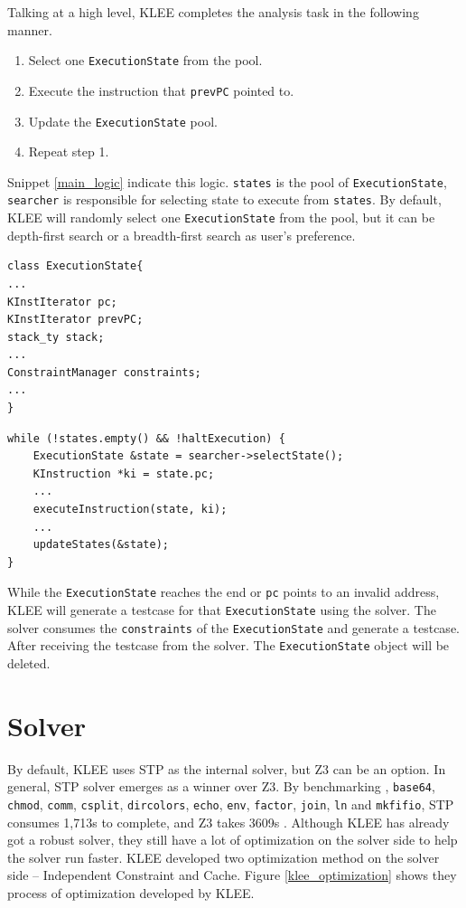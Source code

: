 Talking at a high level, KLEE completes the analysis task in the following manner. 
\begin{enumerate}
    \item Select one \texttt{ExecutionState} from the pool.
    \item Execute the instruction that \texttt{prevPC} pointed to.
    \item Update the \texttt{ExecutionState} pool.
    \item Repeat step 1.
\end{enumerate}
Snippet \ref{main_logic} indicate this logic. \texttt{states} is the pool of \texttt{ExecutionState}, \texttt{searcher} is responsible for selecting state to execute from \texttt{states}. By default, KLEE will randomly select one \texttt{ExecutionState} from the pool, but it can be depth-first search or a breadth-first search as user's preference.

\begin{spacing}{1}
{
\begin{lstlisting}[frame=shadowbox, caption={ExecutionState},label={execution_state}]
class ExecutionState{
...
KInstIterator pc;
KInstIterator prevPC;
stack_ty stack;
...
ConstraintManager constraints;
...
}
\end{lstlisting}
}
\end{spacing}
\clearpage
\begin{spacing}{1}
{
\begin{lstlisting}[frame=shadowbox, caption={KLEE's Main Logic},label={main_logic}]
while (!states.empty() && !haltExecution) {
    ExecutionState &state = searcher->selectState();
    KInstruction *ki = state.pc;
    ...
    executeInstruction(state, ki);
    ...
    updateStates(&state);
}
\end{lstlisting}
}
\end{spacing}
While the \texttt{ExecutionState} reaches the end or \texttt{pc} points to an invalid address, KLEE will generate a  testcase for that \texttt{ExecutionState} using the solver. The solver consumes the \texttt{constraints} of the \texttt{ExecutionState} and generate a testcase. After receiving the testcase from the solver. The \texttt{ExecutionState} object will be deleted.

\section{Solver}

By default, KLEE uses STP \cite{Ganesh:2007:DPB:1770351.1770421} as the internal solver, but Z3 \cite{DeMoura:2008:ZES:1792734.1792766} can be an option. In general, STP solver emerges as a winner over Z3. By benchmarking \text{[}, \texttt{base64}, \texttt{chmod}, \texttt{comm}, \texttt{csplit}, \texttt{dircolors}, \texttt{echo}, \texttt{env}, \texttt{factor}, \texttt{join}, \texttt{ln} and \texttt{mkfifio}, STP consumes 1,713s to complete, and Z3 takes 3609s \cite{multi-solver-support}. Although KLEE has already got a robust solver, they still have a lot of optimization on the solver side to help the solver run faster. KLEE developed two optimization method on the solver side -- Independent Constraint and Cache. Figure \ref{klee_optimization} shows they process of optimization developed by KLEE.

